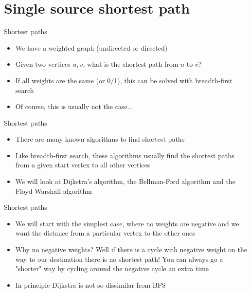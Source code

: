 \documentclass{beamer}
\begin{document}
\section*{Single source shortest path}

\begin{frame}[plain]{Shortest paths}
    \begin{itemize}
        \item We have a weighted graph (undirected or directed)
        \item Given two vertices $u,v$, what is the shortest path from $u$ to $v$?
        \vspace{10pt}
        \item If all weights are the same (or 0/1), this can be solved with breadth-first search
        \item Of course, this is usually not the case...
    \end{itemize}
\end{frame}

\begin{frame}[plain]{Shortest paths}
    \begin{itemize}
        \item There are many known algorithms to find shortest paths
        \item Like breadth-first search, these algorithms usually find the shortest paths from a given start vertex to all other vertices
        \vspace{5pt}
        \item We will look at Dijkstra's algorithm, the Bellman-Ford algorithm and the Floyd-Warshall algorithm
    \end{itemize}
\end{frame}

\begin{frame}[plain]{Shortest paths}
    \begin{itemize}
        \item We will start with the simplest case, where no weights are negative and we want the distance from a particular vertex to the other ones
        \item Why no negative weights? Well if there is a cycle with negative weight on the way to our destination there is no shortest path! You can always go a "shorter" way by cycling around the negative cycle an extra time
        \item In principle Dijkstra is not so dissimilar from BFS
    \end{itemize}
\end{frame}
\end{document}
